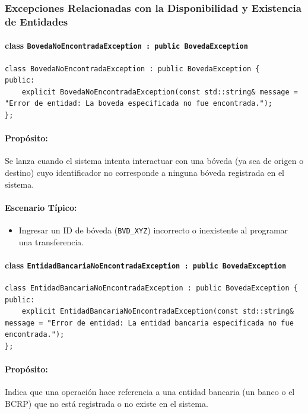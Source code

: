 \documentclass{article}
\newcommand{\inlinecode}[1]{\texttt{#1}}
\begin{document}
\subsubsection*{Excepciones Relacionadas con la Disponibilidad y Existencia de Entidades}

\paragraph*{\textbf{class \inlinecode{BovedaNoEncontradaException : public BovedaException}}}
\vspace{2mm} %
\begin{lstlisting}
class BovedaNoEncontradaException : public BovedaException {
public:
    explicit BovedaNoEncontradaException(const std::string& message = "Error de entidad: La boveda especificada no fue encontrada.");
};
\end{lstlisting}
\paragraph*{Propósito:} Se lanza cuando el sistema intenta interactuar con una b\'oveda (ya sea de origen o destino) cuyo identificador no corresponde a ninguna b\'oveda registrada en el sistema.

\paragraph*{Escenario Típico:}
\begin{itemize}
    \item Ingresar un ID de b\'oveda (\inlinecode{BVD\_XYZ}) incorrecto o inexistente al programar una transferencia.
\end{itemize}

\paragraph*{\textbf{class \inlinecode{EntidadBancariaNoEncontradaException : public BovedaException}}}
\vspace{2mm} %
\begin{lstlisting}
class EntidadBancariaNoEncontradaException : public BovedaException {
public:
    explicit EntidadBancariaNoEncontradaException(const std::string& message = "Error de entidad: La entidad bancaria especificada no fue encontrada.");
};
\end{lstlisting}
\paragraph*{Propósito:} Indica que una operaci\'on hace referencia a una entidad bancaria (un banco o el BCRP) que no est\'a registrada o no existe en el sistema.
\end{document}
